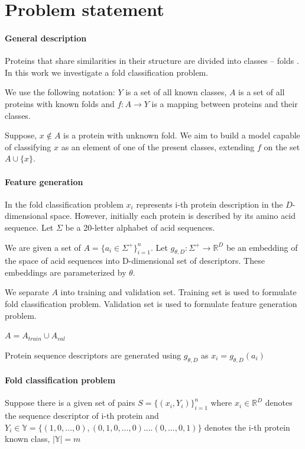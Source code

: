 \documentclass[12pt, twoside]{article}
\begin{document}
\section{Problem statement}
\paragraph{General description}
\noindent
Proteins that share similarities in their structure are  divided into classes -- folds \cite{Schaeffer2011}. In this work we investigate a fold classification problem.  

We use the following notation: $Y$ is a set of all known classes, $A$ is a set of all proteins with known folds and  $f: A \rightarrow Y$ is a mapping between proteins and their classes. 

Suppose, $x \not\in A$ is a protein with unknown fold. We aim to build a model capable of classifying $x$ as an element of one of the present classes, extending $f$ on the set $A \cup \{x\}$. 

\paragraph{Feature generation }
\noindent

In the fold classification problem $x_i$ represents i-th protein description in the $D$-dimensional space. However, initially each protein is described by its amino acid sequence. Let $\Sigma$ be a 20-letter alphabet of acid sequences.  

We are given a set of $A = \{a_i \in \Sigma^+\}_{i = 1}^n$. Let $g_{\theta, D}: \Sigma^+ \rightarrow \mathbb{R}^D$ be an embedding of the space of acid sequences into D-dimensional set of descriptors. These embeddings are parameterized  by $\theta$.

We separate $A$ into training and validation set. Training set is used to formulate fold classification problem. Validation set is used to formulate feature generation problem. 

$A = A_{train} \cup A_{val}$ 

Protein sequence descriptors are generated using $g_{\theta, D}$ as $x_i = g_{\theta, D}(a_i)$ 

\paragraph{Fold classification problem}
\noindent

Suppose there is a given set of pairs $S = \{ (x_i, Y_i)\}_{i = 1}^n$ where $ x_i \in \mathbb{R}^D$ denotes the sequence descriptor of i-th protein and $ Y_i \in \mathbb{Y} = \{ (1, 0, ..., 0), (0, 1, 0, ..., 0) .... (0, ..., 0, 1) \}$ denotes the i-th protein known class, $|\mathbb{Y}| = m$
\end{document}
